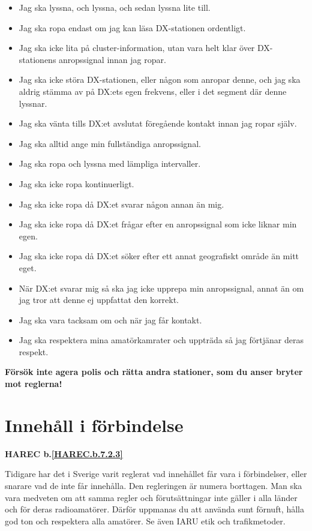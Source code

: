 \begin{itemize}  		
	\item Jag ska lyssna, och lyssna, och sedan lyssna lite till.
	\item Jag ska ropa endast om jag kan läsa DX-stationen ordentligt.
	\item Jag ska icke lita på cluster-information, utan vara helt klar över DX-stationens anropssignal innan jag ropar.
	\item Jag ska icke störa DX-stationen, eller någon som anropar denne, och jag ska aldrig stämma av på DX:ets egen frekvens, eller i det segment där denne lyssnar.
	\item Jag ska vänta tills DX:et avslutat föregående kontakt innan jag ropar själv.
	\item Jag ska alltid ange min fullständiga anropssignal.
	\item Jag ska ropa och lyssna med lämpliga intervaller.
	\item Jag ska icke ropa kontinuerligt.
	\item Jag ska icke ropa då DX:et svarar någon annan än mig.
	\item Jag ska icke ropa då DX:et frågar efter en anropssignal som icke liknar min egen.
	\item Jag ska icke ropa då DX:et söker efter ett annat geografiskt område än mitt eget.
	\item När DX:et svarar mig så ska jag icke upprepa min anropssignal, annat än om jag tror att denne ej uppfattat den korrekt.
	\item Jag ska vara tacksam om och när jag får kontakt.
	\item Jag ska respektera mina amatörkamrater och uppträda så jag förtjänar deras respekt.
	\end{itemize}

\textbf{Försök inte agera polis och rätta andra stationer, som du anser bryter mot reglerna!}

\section{Innehåll i förbindelse}
\textbf{HAREC
  b.\ref{HAREC.b.7.2.3}\label{myHAREC.b.7.2.3}
}

Tidigare har det i Sverige varit reglerat vad innehållet får vara i
förbindelser, eller snarare vad de inte får innehålla.
Den regleringen är numera borttagen.
Man ska vara medveten om att samma regler och förutsättningar inte gäller i
alla länder och för deras radioamatörer.
Därför uppmanas du att använda sunt förnuft, hålla god ton och respektera alla
amatörer.
Se även IARU etik och trafikmetoder.

